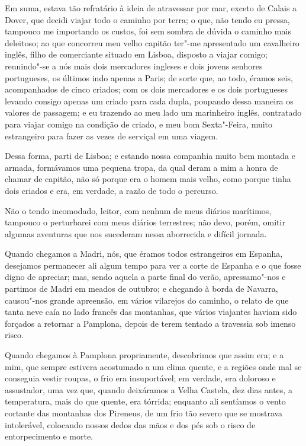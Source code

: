 Em suma, estava tão refratário à ideia de atravessar por mar, exceto de
Calais a Dover, que decidi viajar todo o caminho por terra; o que, não
tendo eu pressa, tampouco me importando os custos, foi sem sombra de
dúvida o caminho mais deleitoso; ao que concorreu meu velho capitão
ter"-me apresentado um cavalheiro inglês, filho de comerciante situado em
Lisboa, disposto a viajar comigo; reunindo"-se a nós mais dois mercadores
ingleses e dois jovens senhores portugueses, os últimos indo apenas a
Paris; de sorte que, ao todo, éramos seis, acompanhados de cinco
criados; com os dois mercadores e os dois portugueses levando consigo
apenas um criado para cada dupla, poupando dessa maneira os valores de
passagem; e eu trazendo ao meu lado um marinheiro inglês, contratado
para viajar comigo na condição de criado, e meu bom Sexta"-Feira, muito
estrangeiro para fazer as vezes de serviçal em uma viagem.

Dessa forma, parti de Lisboa; e estando nossa companhia muito bem
montada e armada, formávamos uma pequena tropa, da qual deram a mim a
honra de chamar de capitão, não só porque era o homem mais velho, como
porque tinha dois criados e era, em verdade, a razão de todo o percurso.

Não o tendo incomodado, leitor, com nenhum de meus diários marítimos,
tampouco o perturbarei com meus diários terrestres; não devo, porém,
omitir algumas aventuras que nos sucederam nessa aborrecida e difícil
jornada.

Quando chegamos a Madri, nós, que éramos todos estrangeiros em Espanha,
desejamos permanecer ali algum tempo para ver a corte de Espanha e o que
fosse digno de apreciar; mas, sendo aquela a parte final do verão,
apressamo"-nos e partimos de Madri em meados de outubro; e chegando à
borda de Navarra, causou"-nos grande apreensão, em vários vilarejos do
caminho, o relato de que tanta neve caía no lado francês das montanhas,
que vários viajantes haviam sido forçados a retornar a Pamplona, depois
de terem tentado a travessia sob imenso risco.

Quando chegamos à Pamplona propriamente, descobrimos que assim era; e a
mim, que sempre estivera acostumado a um clima quente, e a regiões onde
mal se conseguia vestir roupas, o frio era insuportável; em verdade, era
doloroso e assustador, uma vez que, quando deixáramos a Velha Castela,
dez dias antes, a temperatura, mais do que quente, era tórrida; enquanto
ali sentíamos o vento cortante das montanhas dos Pireneus, de um frio
tão severo que se mostrava intolerável, colocando nossos dedos das mãos
e dos pés sob o risco de entorpecimento e morte.

